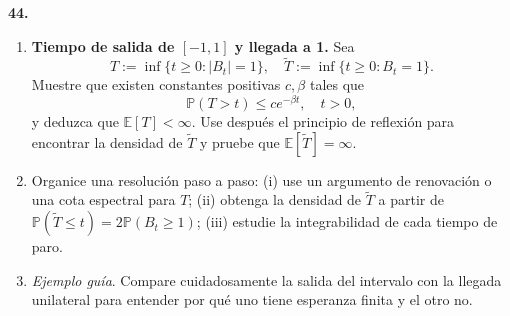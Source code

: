 \documentclass[11pt, letterpaper]{article}
\begin{document}
\newpage

\begin{ejercicio}
    \textbf{44.} 
    \begin{enumerate}
        \item[(a)] \textbf{Tiempo de salida de $[-1, 1]$ y llegada a 1.} Sea
        \[ T := \inf\{t \ge 0 : |B_t| = 1\}, \quad \tilde{T} := \inf\{t \ge 0 : B_t = 1\}. \]
        Muestre que existen constantes positivas $c, \beta$ tales que
        \[ \mathbb{P}(T > t) \le c e^{-\beta t}, \quad t > 0, \]
        y deduzca que $\mathbb{E}[T] < \infty$. Use después el principio de reflexión para encontrar la densidad de $\tilde{T}$ y pruebe que $\mathbb{E}[\tilde{T}] = \infty$.
        \item[(b)] Organice una resolución paso a paso: (i) use un argumento de renovación o una cota espectral para $T$; (ii) obtenga la densidad de $\tilde{T}$ a partir de $\mathbb{P}(\tilde{T} \le t) = 2\mathbb{P}(B_t \ge 1)$; (iii) estudie la integrabilidad de cada tiempo de paro.
        \item[(c)] \textit{Ejemplo guía}. Compare cuidadosamente la salida del intervalo con la llegada unilateral para entender por qué uno tiene esperanza finita y el otro no.
    \end{enumerate}
\end{ejercicio}

\vspace{5mm}
\end{document}
